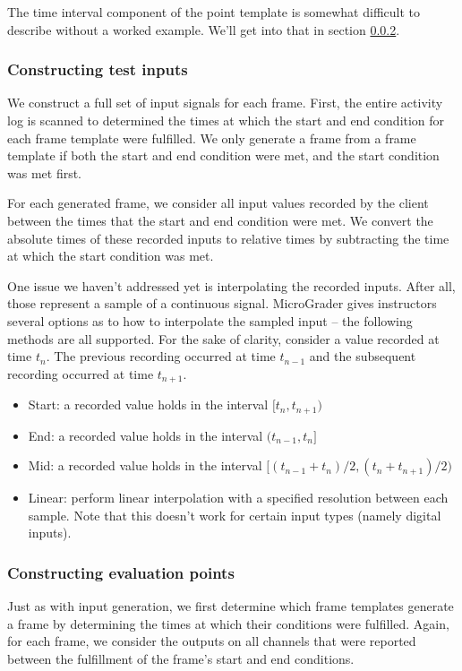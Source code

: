 \documentclass[12pt]{article}
\begin{document}
The time interval component of the point template is somewhat difficult to describe without a worked example.  We'll get into that in section \ref{sec:using-point-templates}.

\subsubsection{Constructing test inputs}
We construct a full set of input signals for each frame. First, the entire activity log is scanned to determined the times at which the start and end condition for each frame template were fulfilled.  We only generate a frame from a frame template if both the start and end condition were met, and the start condition was met first.

For each generated frame, we consider all input values recorded by the client between the times that the start and end condition were met.  We convert the absolute times of these recorded inputs to relative times by subtracting the time at which the start condition was met.

One issue we haven't addressed yet is interpolating the recorded inputs.  After all, those represent a sample of a continuous signal.  MicroGrader gives instructors several options as to how to interpolate the sampled input -- the following methods are all supported.  For the sake of clarity, consider a value recorded at time $t_n$.  The previous recording occurred at time $t_{n-1}$ and the subsequent recording occurred at time $t_{n+1}$.

\begin{itemize}
\item Start: a recorded value holds in the interval $[t_n, t_{n+1})$
\item End: a recorded value holds in the interval $(t_{n-1}, t_n]$
\item Mid: a recorded value holds in the interval $[(t_{n-1} + t_n)/2, (t_n + t_{n+1})/2)$
\item Linear: perform linear interpolation with a specified resolution between each sample.  Note that this doesn't work for certain input types (namely digital inputs).
\end{itemize}

\subsubsection{Constructing evaluation points}
\label{sec:using-point-templates}
Just as with input generation, we first determine which frame templates generate a frame by determining the times at which their conditions were fulfilled.  Again, for each frame, we consider the outputs on all channels that were reported between the fulfillment of the frame's start and end conditions.
\end{document}
